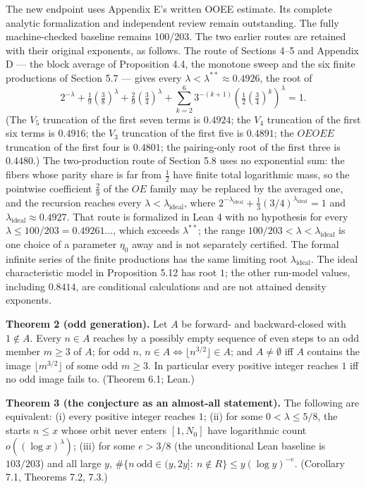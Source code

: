 \documentclass[11pt,a4paper]{article}
\begin{document}
The new endpoint uses Appendix E's written OOEE estimate. Its complete
analytic formalization and independent review remain outstanding. The
fully machine-checked baseline remains 100/203. The two earlier routes
are retained with their original exponents, as follows. The route of
Sections 4--5 and Appendix D --- the block average of Proposition 4.4,
the monotone sweep and the six finite productions of Section 5.7 ---
gives every \(\lambda<\lambda^{**}\approx0.4926\), the root of \[
2^{-\lambda}+\tfrac19(\tfrac38)^\lambda+\tfrac29(\tfrac34)^\lambda
 +\sum_{k=2}^{6}3^{-(k+1)}\left(\tfrac12(\tfrac34)^k\right)^\lambda=1.
\tag{1.1}
\] (The \(V_5\) truncation of the first seven terms is \(0.4924\); the
\(V_4\) truncation of the first six terms is \(0.4916\); the \(V_3\)
truncation of the first five is \(0.4891\); the \(OEOEE\) truncation of
the first four is \(0.4801\); the pairing-only root of the first three
is \(0.4480\).) The two-production route of Section 5.8 uses no
exponential sum: the fibers whose parity share is far from \(\tfrac12\)
have finite total logarithmic mass, so the pointwise coefficient
\(\tfrac29\) of the \(OE\) family may be replaced by the averaged one,
and the recursion reaches every \(\lambda<\lambda_{\mathrm{ideal}}\),
where
\(2^{-\lambda_{\mathrm{ideal}}}+\tfrac13(3/4)^{\lambda_{\mathrm{ideal}}}=1\)
and \(\lambda_{\mathrm{ideal}}\approx0.4927\). That route is formalized
in Lean 4 with no hypothesis for every
\(\lambda\le100/203=0.49261\ldots\), which exceeds \(\lambda^{**}\); the
range \(100/203<\lambda<\lambda_{\mathrm{ideal}}\) is one choice of a
parameter \(\eta_0\) away and is not separately certified. The formal
infinite series of the finite productions has the same limiting root
\(\lambda_{\mathrm{ideal}}\). The ideal characteristic model in
Proposition 5.12 has root \(1\); the other run-model values, including
\(0.8414\), are conditional calculations and are not attained density
exponents.

\textbf{Theorem 2 (odd generation).} Let \(A\) be forward- and
backward-closed with \(1\notin A\). Every \(n\in A\) reaches by a
possibly empty sequence of even steps to an odd member \(m\ge 3\) of
\(A\); for odd \(n\), \(n\in A\iff\lfloor n^{3/2}\rfloor\in A\); and
\(A\ne\emptyset\) iff \(A\) contains the image
\(\lfloor m^{3/2}\rfloor\) of some odd \(m\ge 3\). In particular every
positive integer reaches \(1\) iff no odd image fails to. (Theorem 6.1;
Lean.)

\textbf{Theorem 3 (the conjecture as an almost-all statement).} The
following are equivalent: (i) every positive integer reaches \(1\); (ii)
for some \(0<\lambda\le5/8\), the starts \(n\le x\) whose orbit never
enters \([1,N_0]\) have logarithmic count \(o((\log x)^{\lambda})\);
(iii) for some \(e>3/8\) (the unconditional Lean baseline is
\(103/203\)) and all large \(y\),
\(\#\{n\ \text{odd}\in(y,2y]:\ n\notin R\}\le y(\log y)^{-e}\).
(Corollary 7.1, Theorems 7.2, 7.3.)
\end{document}
